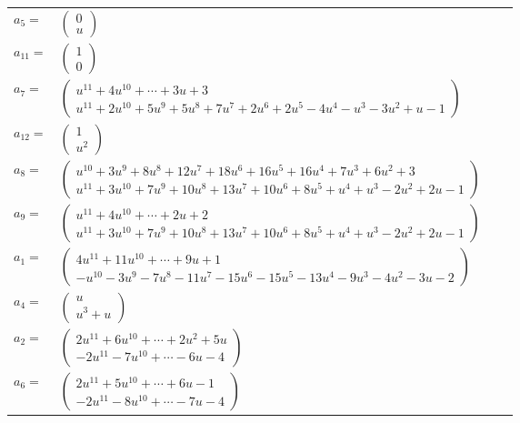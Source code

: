 \documentclass[1p]{elsarticle_modified}
\theoremstyle{definition}
\begin{document}
\begin{tabular}{m{7pt} m{180pt} m{7pt} m{180pt} }
\flushright $a_{5}=$&$\begin{pmatrix}0\\u\end{pmatrix}$ \\
\flushright $a_{11}=$&$\begin{pmatrix}1\\0\end{pmatrix}$ \\
\flushright $a_{7}=$&$\begin{pmatrix}u^{11}+4 u^{10}+\cdots+3 u+3\\u^{11}+2 u^{10}+5 u^9+5 u^8+7 u^7+2 u^6+2 u^5-4 u^4- u^3-3 u^2+u-1\end{pmatrix}$ \\
\flushright $a_{12}=$&$\begin{pmatrix}1\\u^2\end{pmatrix}$ \\
\flushright $a_{8}=$&$\begin{pmatrix}u^{10}+3 u^9+8 u^8+12 u^7+18 u^6+16 u^5+16 u^4+7 u^3+6 u^2+3\\u^{11}+3 u^{10}+7 u^9+10 u^8+13 u^7+10 u^6+8 u^5+u^4+u^3-2 u^2+2 u-1\end{pmatrix}$ \\
\flushright $a_{9}=$&$\begin{pmatrix}u^{11}+4 u^{10}+\cdots+2 u+2\\u^{11}+3 u^{10}+7 u^9+10 u^8+13 u^7+10 u^6+8 u^5+u^4+u^3-2 u^2+2 u-1\end{pmatrix}$ \\
\flushright $a_{1}=$&$\begin{pmatrix}4 u^{11}+11 u^{10}+\cdots+9 u+1\\- u^{10}-3 u^9-7 u^8-11 u^7-15 u^6-15 u^5-13 u^4-9 u^3-4 u^2-3 u-2\end{pmatrix}$ \\
\flushright $a_{4}=$&$\begin{pmatrix}u\\u^3+u\end{pmatrix}$ \\
\flushright $a_{2}=$&$\begin{pmatrix}2 u^{11}+6 u^{10}+\cdots+2 u^2+5 u\\-2 u^{11}-7 u^{10}+\cdots-6 u-4\end{pmatrix}$ \\
\flushright $a_{6}=$&$\begin{pmatrix}2 u^{11}+5 u^{10}+\cdots+6 u-1\\-2 u^{11}-8 u^{10}+\cdots-7 u-4\end{pmatrix}$ \\

\end{tabular}
\end{document}
